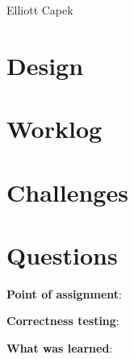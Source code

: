 \documentclass[11pt]{article}
\begin{document}
Elliott Capek \\

\section{Design}



\section{Worklog}


\section{Challenges}

\section{Questions}
\textbf{Point of assignment}:

\textbf{Correctness testing}:

\textbf{What was learned}:
\end{document}
